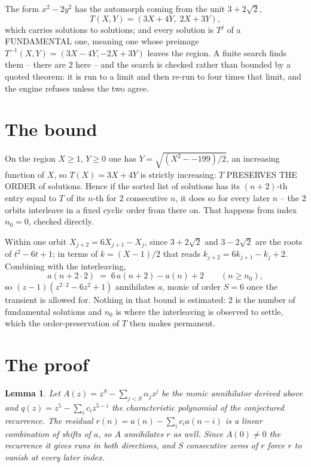 \documentclass[11pt,a4paper]{article}
\theoremstyle{plain}
\newtheorem{lemma}[theorem]{Lemma}
\theoremstyle{definition}
\begin{document}
The form $x^2-2y^2$ has the automorph coming from the unit $3+2\sqrt2$,
\[
T(X,Y)=(3X+4Y,\;2X+3Y),
\]
which carries solutions to solutions; and every solution is $T^{j}$ of a FUNDAMENTAL one,
meaning one whose preimage $T^{-1}(X,Y)=(3X-4Y,-2X+3Y)$ leaves the region. A finite search
finds them -- there are $2$ here -- and the search is checked rather than bounded by a quoted
theorem: it is run to a limit and then re-run to four times that limit, and the engine refuses
unless the two agree.

\section{The bound}

On the region $X\ge1$, $Y\ge0$ one has $Y=\sqrt{(X^2--199)/2}$, an increasing function of $X$,
so $T(X)=3X+4Y$ is strictly increasing: $T$ PRESERVES THE ORDER of solutions. Hence if the
sorted list of solutions has its $(n+2)$-th entry equal to $T$ of its $n$-th for $2$
consecutive $n$, it does so for every later $n$ -- the $2$ orbits interleave in a fixed cyclic
order from there on. That happens from index $n_0=0$, checked directly.

Within one orbit $X_{j+2}=6X_{j+1}-X_j$, since $3+2\sqrt2$ and $3-2\sqrt2$ are the roots of
$t^2-6t+1$; in terms of $k=(X-1)/2$ that reads $k_{j+2}=6k_{j+1}-k_j+2$. Combining with the
interleaving,
\[
a(n+2\cdot2)\;=\;6\,a(n+2)-a(n)+2 \qquad (n\ge n_0),
\]
so $(z-1)(z^{2\cdot2}-6z^{2}+1)$ annihilates $a$, monic of order $S=6$ once the
transient is allowed for. Nothing in that bound is estimated: $2$ is the number of fundamental
solutions and $n_0$ is where the interleaving is observed to settle, which the order-preservation
of $T$ then makes permanent.

\section{The proof}

\begin{lemma}\label{lem:crit}
Let $A(z)=z^S-\sum_{j<S}\alpha_jz^{j}$ be the monic annihilator derived above and
$q(z)=z^{5}-\sum_ic_iz^{5-i}$ the characteristic polynomial of the conjectured
recurrence. The residual $r(n)=a(n)-\sum_ic_ia(n-i)$ is a linear combination of shifts of $a$,
so $A$ annihilates $r$ as well. Since $A(0)\ne0$ the recurrence it gives runs in both
directions, and $S$ consecutive zeros of $r$ force $r$ to vanish at every later index.
\end{lemma}
\end{document}
